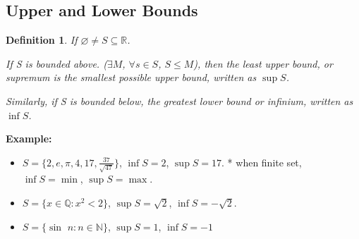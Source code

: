 \documentclass[12pt]{article}
\theoremstyle{plain}
\newtheorem{definition}{Definition}[subsection]
\let\emptyset\varnothing
\begin{document}
    \subsection{Upper and Lower Bounds}
    \begin{definition}
        If $\emptyset \neq S \subseteq \mathbb{R}$. 
        
        If S is bounded above. ($\exists M$, $\forall s \in S$, $S \leq M$),
        then the least upper bound, or supremum
        is the smallest possible upper bound, written as \textbf{$\sup S$}. 

        Similarly, if S is bounded below, the greatest lower bound or infinium, 
        written as \textbf{$\inf S$}.
    \end{definition}

    {\color{Brown}
    \textbf{Example:} 
    \begin{itemize}
        \item $S=\{2, e, \pi, 4, 17, \frac{37}{\sqrt {47}} \}$, $\inf S = 2$, $\sup S = 17$.
                * when finite set, $\inf S = \min$, $\sup S = \max$.
        \item $S =\{x\in\mathbb{Q} : x^2 < 2\}$, $\sup S =\sqrt2$, $\inf S = -\sqrt 2$.
        \item $S =\{\sin\,\, n : n\in\mathbb{N}\}$, $\sup S = 1$, $\inf S = -1$\\
    \end{itemize}}
\end{document}
